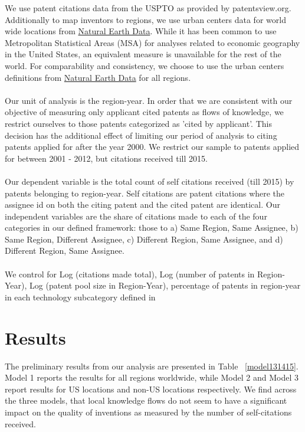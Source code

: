 \documentclass[12pt]{article}
\begin{document}
We use patent citations data from the USPTO as provided by patentsview.org. Additionally to map inventors to regions, we use urban centers data for world wide locations from \href{http://www.naturalearthdata.com/downloads/10m-cultural-vectors/}{Natural Earth Data}.  While it has been common to use Metropolitan Statistical Areas (MSA) for analyses related to economic geography in the United States, an equivalent measure is unavailable for the rest of the world. For comparability and consistency, we choose to use the urban centers definitions from \href{http://www.naturalearthdata.com/downloads/10m-cultural-vectors/}{Natural Earth Data} for all regions.
\\\\
Our unit of analysis is the region-year. In order that we are consistent with our objective of measuring only applicant cited patents as flows of knowledge, we restrict ourselves to those patents categorized as 'cited by applicant'. This decision has the additional effect of limiting our period of analysis to citing patents applied for after the year 2000. We restrict our sample to patents applied for between 2001 - 2012, but citations received till 2015.
\\\\
Our dependent variable is the  total count of self citations received (till 2015) by patents belonging to region-year. Self citations are patent citations where the assignee id on both the citing patent and the cited patent are identical. Our independent variables are the share of citations made to each of the four categories in our defined framework: those to a) Same Region, Same Assignee, b) Same Region, Different Assignee, c) Different Region, Same Assignee, and d) Different Region, Same Assignee.
\\\\
We control for Log (citations made total), Log (number of patents in Region-Year), Log (patent pool size in Region-Year), percentage of patents in region-year in each technology subcategory defined in \cite{Hall2001}

\section*{Results}
The preliminary results from our analysis are presented in Table ~\ref{model131415}. Model 1 reports the results for all regions worldwide, while Model 2 and Model 3 report results for US locations and non-US locations respectively. We find across the three models, that local knowledge flows do not seem to have a significant impact on the quality of inventions as measured by the number of self-citations received. 
\begin{landscape}
\begin{centering}

\end{centering}
\end{landscape}
\end{document}
